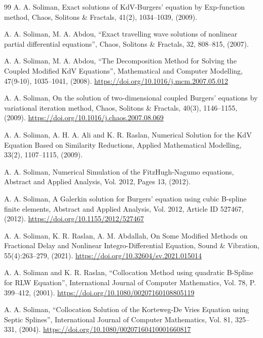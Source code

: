 \documentclass[10pt,letterpaper,twoside]{article}
\begin{document}
\begin{thebibliography}{99}
 A. A. Soliman, Exact solutions of KdV-Burgers' equation by Exp-function method, Chaos, Solitons \& Fractals, 41(2), 1034--1039, (2009).

 A. A. Soliman, M. A. Abdou, ``Exact travelling wave solutions of nonlinear partial differential equations'', Chaos, Solitons \& Fractals, 32, 808--815, (2007).

 A. A. Soliman, M. A. Abdou, ``The Decomposition Method for Solving the Coupled Modified KdV Equations'', Mathematical and Computer Modelling, 47(9-10), 1035--1041, (2008). \href{https://doi.org/10.1016/j.mcm.2007.05.012}{https://doi.org/10.1016/j.mcm.2007.05.012}

 A. A. Soliman, On the solution of two-dimensional coupled Burgers' equations by variational iteration method, Chaos, Solitons \& Fractals, 40(3), 1146--1155, (2009). \href{https://doi.org/10.1016/j.chaos.2007.08.069}{https://doi.org/10.1016/j.chaos.2007.08.069}

 A. A. Soliman, A. H. A. Ali and K. R. Raslan, Numerical Solution for the KdV Equation Based on Similarity Reductions, Applied Mathematical Modelling, 33(2), 1107--1115, (2009).

 A. A. Soliman, Numerical Simulation of the FitzHugh-Nagumo equations, Abstract and Applied Analysis, Vol. 2012, Pages 13, (2012).

 A. A. Soliman, A Galerkin solution for Burgers' equation using cubic B-spline finite elements, Abstract and Applied Analysis, Vol. 2012, Article ID 527467, (2012). \href{https://doi.org/10.1155/2012/527467}{https://doi.org/10.1155/2012/527467}

 A. A. Soliman, K. R. Raslan, A. M. Abdallah, On Some Modified Methods on Fractional Delay and Nonlinear Integro-Differential Equation, Sound \& Vibration, 55(4):263--279, (2021). \href{https://doi.org/10.32604/sv.2021.015014}{https://doi.org/10.32604/sv.2021.015014}

 A. A. Soliman and K. R. Raslan, ``Collocation Method using quadratic B-Spline for RLW Equation'', International Journal of Computer Mathematics, Vol. 78, P. 399--412, (2001). \href{https://doi.org/10.1080/00207160108805119}{https://doi.org/10.1080/00207160108805119}

 A. A. Soliman, ``Collocation Solution of the Korteweg-De Vries Equation using Septic Splines'', International Journal of Computer Mathematics, Vol. 81, 325--331, (2004). \href{https://doi.org/10.1080/00207160410001660817}{https://doi.org/10.1080/00207160410001660817}


\end{thebibliography}
\end{document}
